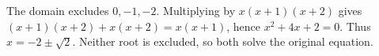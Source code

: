 The domain excludes $0,-1,-2$. Multiplying by $x(x+1)(x+2)$ gives $(x+1)(x+2)+x(x+2)=x(x+1)$, hence $x^2+4x+2=0$. Thus $\boxed{x=-2\pm\sqrt2}$. Neither root is excluded, so both solve the original equation.
